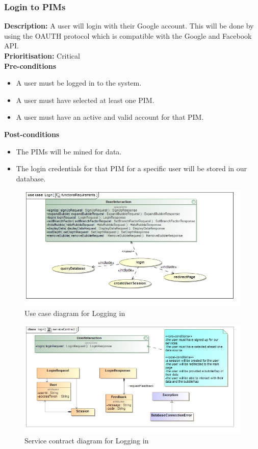 \documentclass[hidelinks,english]{article}
\begin{document}
    		\subsubsection{Login to PIMs}
				\textbf{Description:}  A user will login with their Google account. This will be done by using the OAUTH protocol which is compatible with the Google and Facebook API.\\
    			\textbf{Prioritisation:} Critical\\
      			\textbf{Pre-conditions}
    			\begin{itemize}
        			\item A user must be logged in to the system.
        			\item A user must have selected at least one PIM.
        			\item A user must have an active and valid account for that PIM.
    			\end{itemize}
    			\textbf{Post-conditions}
     			\begin{itemize}
        			\item The PIMs will be mined for data.
        			\item The login credentials for that PIM for a specific user will be stored in our database.
    			\end{itemize}
    			
    			\begin{figure}[!h]
    			\includegraphics[width=\linewidth]{functionalRequirementsLogin.jpg}
    			\caption{Use case diagram for Logging in}
    			\label{UseCaseLogin}
    			\end{figure}
    			
    			\begin{figure}[!h]
    			\includegraphics[width=\linewidth]{serviceContractLogin.jpg}
    			\caption{Service contract diagram for Logging in}
    			\label{ServiceContractLogin}
    			\end{figure}
    			
\end{document}
